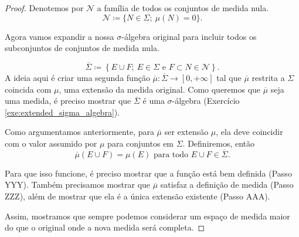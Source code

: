 \begin{proof}
    Denotemos por $\mathcal{N}$ a família de todos os conjuntos de medida nula.
    \begin{equation*}
        \mathcal{N}\coloneqq \{N\in\Sigma; \ \mu(N)=0\}.
    \end{equation*}
    
    Agora vamos expandir a nossa \texorpdfstring{$\sigma$}{sigma}-álgebra original para incluir todos os subconjuntos de conjuntos de medida nula.
    
    \begin{equation*}
        \overline{\Sigma}\coloneqq \left\{E\cup F; \ E\in \Sigma \text{ e } F\subset N\in\mathcal{N}\right\}.
    \end{equation*} 
    A ideia aqui é criar uma segunda função $\overline{\mu}:\overline{\Sigma}\rightarrow \left[0,+\infty\right]$ tal que $\overline{\mu}$ restrita a $\Sigma$ coincida com $\mu$, uma extensão da medida original. Como queremos que $\overline{\mu}$ seja uma medida, é preciso mostrar que $\overline{\Sigma}$ é uma \texorpdfstring{$\sigma$}{sigma}-álgebra (Exercício \ref{exe:extended_sigma_algebra}).

    Como argumentamos anteriormente, para $\overline{\mu}$ ser extensão $\mu$, ela deve coincidir com o valor assumido por $\mu$ para conjuntos em $\Sigma$. Definiremos, então
    \begin{equation*}
    \overline{\mu}(E\cup F) = \mu(E) \text{ para todo } E\cup F \in \overline{\Sigma}.
    \end{equation*}

    Para que isso funcione, é preciso mostrar que a função está bem definida (Passo YYY). Também precisamos mostrar que $\overline{\mu}$ satisfaz a definição de medida (Passo ZZZ), além de mostrar que ela é a única extensão existente (Passo AAA).

    Assim, mostramos que sempre podemos considerar um espaço de medida maior do que o original onde a nova medida será completa.
\end{proof}